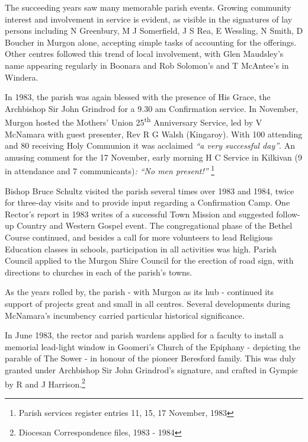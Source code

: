 The succeeding years saw many memorable parish events. Growing community interest and involvement in service is evident, as visible in the signatures of lay persons including N Greenbury, M J Somerfield, J S Rea, E Wessling, N Smith, D Boucher in Murgon alone, accepting simple tasks of accounting for the offerings. Other centres followed this trend of local involvement, with Glen Maudsley's name appearing regularly in Boonara and Rob Solomon's and T McAntee's in Windera.



In 1983, the parish was again blessed with the presence of His Grace, the Archbishop Sir John Grindrod for a 9.30 am Confirmation service. In November, Murgon hosted the Mothers' Union 25\textsuperscript{th} Anniversary Service, led by V McNamara with guest presenter, Rev R G Walsh (Kingaroy). With 100 attending and 80 receiving Holy Communion it was acclaimed \emph{``a very successful day''}. An amusing comment for the 17 November, early morning H C Service in Kilkivan (9 in attendance and 7 communicants)\emph{: ``No men present!''} \footnote{Parish services register entries 11, 15, 17 November, 1983}


Bishop Bruce Schultz visited the parish several times over 1983 and 1984, twice for three-day visits and to provide input regarding a Confirmation Camp. One Rector's report in 1983 writes of a successful Town Mission and suggested follow-up Country and Western Gospel event. The congregational phase of the Bethel Course continued, and besides a call for more volunteers to lead Religious Education classes in schools, participation in all activities was high. Parish Council applied to the Murgon Shire Council for the erection of road sign, with directions to churches in each of the parish's towns.



As the years rolled by, the parish - with Murgon as its hub - continued its support of projects great and small in all centres. Several developments during McNamara's incumbency carried particular historical significance.



In June 1983, the rector and parish wardens applied for a faculty to install a memorial lead-light window in Goomeri's Church of the Epiphany - depicting the parable of The Sower - in honour of the pioneer Beresford family. This was duly granted under Archbishop Sir John Grindrod's signature, and crafted in Gympie by R and J Harrison.\footnote{Diocesan Correspondence files, 1983 - 1984}


